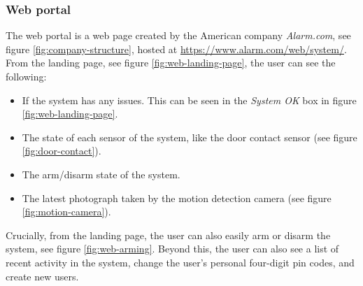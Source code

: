 \subsubsection{Web portal}
The web portal is a web page created by the American company \textit{Alarm.com}, see figure \ref{fig:company-structure}, hosted at \url{https://www.alarm.com/web/system/}. From the landing page, see figure \ref{fig:web-landing-page}, the user can see the following:
\begin{itemize}
    \item If the system has any issues. This can be seen in the \textit{System OK} box in figure \ref{fig:web-landing-page}.
    \item The state of each sensor of the system, like the door contact sensor (see figure \ref{fig:door-contact}).
    \item The arm/disarm state of the system.
    \item The latest photograph taken by the motion detection camera (see figure \ref{fig:motion-camera}).
\end{itemize}
Crucially, from the landing page, the user can also easily arm or disarm the system, see figure \ref{fig:web-arming}. Beyond this, the user can also see a list of recent activity in the system, change the user's personal four-digit pin codes, and create new users.

